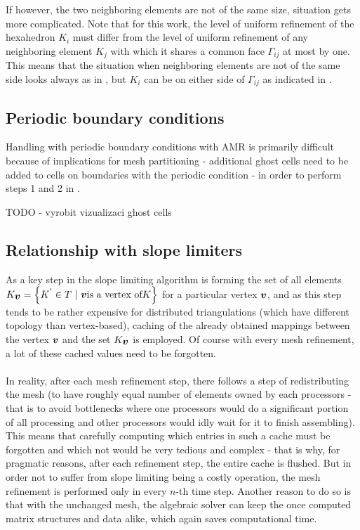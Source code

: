 If however, the two neighboring elements are not of the same size, situation gets more complicated. Note that for this work, the level of uniform refinement of the hexahedron $K_i$ must differ from the level of uniform refinement of any neighboring element $K_j$ with which it shares a common face $\Gamma_{ij}$ at most by one. This means that the situation when neighboring elements are not of the same side looks always as in , but $K_i$ can be on either side of $\Gamma_{ij}$ as indicated in .

\subsection{Periodic boundary conditions}
\label{amrPer}
Handling with periodic boundary conditions with AMR is primarily difficult because of implications for mesh partitioning - additional ghost cells need to be added to cells on boundaries with the periodic condition - in order to perform steps 1 and 2 in .

TODO - vyrobit vizualizaci ghost cells%

\subsection{Relationship with slope limiters}
As a key step in the slope limiting algorithm  is forming the set of all elements $K_{\bfv} = \left\{K^{'}\in T\ |\ \bfv \text{is a vertex of} K\right\}$ for a particular vertex $\mbox{\boldmath $v$}$, and as this step tends to be rather expensive for distributed triangulations (which have different topology than vertex-based), caching of the already obtained mappings between the vertex $\mbox{\boldmath $v$}$ and the set $K_{\mbox{\boldmath $v$}}$ is employed. Of course with every mesh refinement, a lot of these cached values need to be forgotten.
\paragraph{}
In reality, after each mesh refinement step, there follows a step of redistributing the mesh (to have roughly equal number of elements owned by each processors - that is to avoid bottlenecks where one processors would do a significant portion of all processing and other processors would idly wait for it to finish assembling). This means that carefully computing which entries in such a cache must be forgotten and which not would be very tedious and complex - that is why, for pragmatic reasons, after each refinement step, the entire cache is flushed. But in order not to suffer from slope limiting being a costly operation, the mesh refinement is performed only in every $n$-th time step. Another reason to do so is that with the unchanged mesh, the algebraic solver can keep the once computed matrix structures and data alike, which again saves computational time.